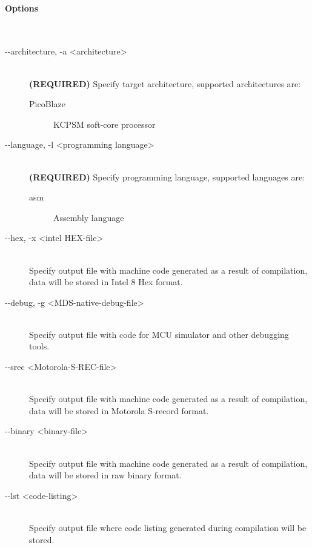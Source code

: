     \paragraph{Options}~\\
        \begin{description}
            \item[-{}-architecture, -a <architecture>]~\\
                \textbf{(REQUIRED)} Specify target architecture, supported architectures are:
                \begin{description}
                    \item[PicoBlaze] KCPSM soft-core processor
                \end{description}

            \item[-{}-language, -l <programming language>]~\\
                \textbf{(REQUIRED)} Specify programming language, supported languages are:
                \begin{description}
                    \item[asm] Assembly language
                \end{description}

            \item[-{}-hex, -x <intel HEX-file>]~\\
                Specify output file with machine code generated as a result of compilation, data will be stored in Intel 8 Hex format.

            \item[-{}-debug, -g <MDS-native-debug-file>]~\\
                Specify output file with code for MCU simulator and other debugging tools.

            \item[-{}-srec <Motorola-S-REC-file>]~\\
                Specify output file with machine code generated as a result of compilation, data will be stored in Motorola S-record format.

            \item[-{}-binary <binary-file>]~\\
                Specify output file with machine code generated as a result of compilation, data will be stored in raw binary format.

            \item[-{}-lst <code-listing>]~\\
                Specify output file where code listing generated during compilation will be stored.


\end{description}
